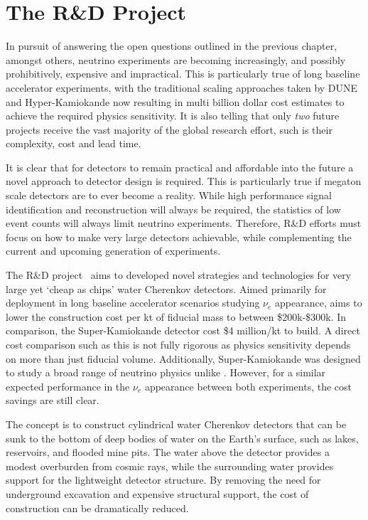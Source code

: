 \chapter{The \chips R\&D Project} %
\label{chap:chips}

In pursuit of answering the open questions outlined in the previous chapter, amongst others,
neutrino experiments are becoming increasingly, and possibly prohibitively, expensive and
impractical. This is particularly true of long baseline accelerator experiments, with the
traditional scaling approaches taken by DUNE and Hyper-Kamiokande now resulting in multi billion
dollar cost estimates to achieve the required physics sensitivity. It is also telling that only
\emph{two} future projects receive the vast majority of the global research effort, such is their
complexity, cost and lead time.

It is clear that for detectors to remain practical and affordable into the future a novel approach
to detector design is required. This is particularly true if megaton scale detectors are to ever
become a reality. While high performance signal identification and reconstruction will always be
required, the statistics of low event counts will always limit neutrino experiments. Therefore,
R\&D efforts must focus on how to make very large detectors achievable, while complementing the
current and upcoming generation of experiments.

The \chips R\&D project~\cite{adamson2013} aims to developed novel strategies and technologies for
very large yet `cheap as chips' water Cherenkov detectors. Aimed primarily for deployment in long
baseline accelerator scenarios studying $\nu_{e}$ appearance, \chips aims to lower the
construction cost per kt of fiducial mass to between \$200k-\$300k. In comparison, the
Super-Kamiokande detector cost \$4 million/kt to build. A direct cost comparison such as this is
not fully rigorous as physics sensitivity depends on more than just fiducial volume. Additionally,
Super-Kamiokande was designed to study a broad range of neutrino physics unlike \chips. However,
for a similar expected performance in the $\nu_{e}$ appearance between both experiments, the cost
savings are still clear.

The \chips concept is to construct cylindrical water Cherenkov detectors that can be sunk to the
bottom of deep bodies of water on the Earth's surface, such as lakes, reservoirs, and flooded mine
pits. The water above the detector provides a modest overburden from cosmic rays, while the
surrounding water provides support for the lightweight detector structure. By removing the need
for underground excavation and expensive structural support, the cost of construction can be
dramatically reduced.

